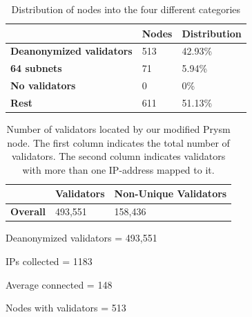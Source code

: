 \begin{table}[]
    \centering
    \caption{Distribution of nodes into the four different categories}
    \begin{tabular}{lll}
        \hline
        & \textbf{Nodes} & \textbf{Distribution} \\ \hline
        \textbf{Deanonymized validators} & 513            & 42.93\%                 \\
        \textbf{64 subnets}              & 71             & 5.94\%                  \\
        \textbf{No validators}           & 0              & 0\%                     \\
        \textbf{Rest}                    & 611            & 51.13\%                 \\ \hline
    \end{tabular}
    \label{tab:distribution}
\end{table}


\begin{table}[]
    \centering
    \caption{Number of validators located by our modified Prysm node. The first column indicates the total number of validators. The second column indicates validators with more than one IP-address mapped to it.}
    \begin{tabular}{lll}
        \hline
        & \textbf{Validators} & \textbf{Non-Unique Validators} \\ \hline
        \textbf{Overall} & 493,551             & 158,436                        \\ \hline
    \end{tabular}
    \label{tab:unique vals}
\end{table}



Deanonymized validators = 493,551

IPs collected = 1183

Average connected = 148

Nodes with validators = 513

